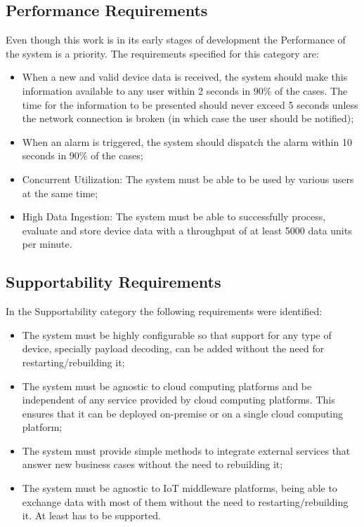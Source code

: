\subsection{Performance Requirements}
\label{subsec:requirements:non_functional:performance}

Even though this work is in its early stages of development the Performance of the system is a priority. The requirements specified for this category are:

\begin{itemize}
    \item When a new and valid device data is received, the system should make this information available to any user within 2 seconds in 90\% of the cases. The time for the information to be presented should never exceed 5 seconds unless the network connection is broken (in which case the user should be notified);
    \item When an alarm is triggered, the system should dispatch the alarm within 10 seconds in 90\% of the cases;
    \item Concurrent Utilization: The system must be able to be used by various users at the same time;
    \item High Data Ingestion: The system must be able to successfully process, evaluate and store device data with a throughput of at least 5000 data units per minute.
\end{itemize}

\subsection{Supportability Requirements}
\label{subsec:requirements:non_functional:supportability}

In the Supportability category the following requirements were identified:

\begin{itemize}
    \item The system must be highly configurable so that support for any type of device, specially payload decoding, can be added without the need for restarting/rebuilding it;
    \item The system must be agnostic to cloud computing platforms and be independent of any service provided by cloud computing platforms. This ensures that it can be deployed on-premise or on a single cloud computing platform;
    \item The system must provide simple methods to integrate external services that answer new business cases without the need to rebuilding it;
    \item The system must be agnostic to \gls{IoT} middleware platforms, being able to exchange data with most of them without the need to restarting/rebuilding it. At least  has to be supported.
\end{itemize}

